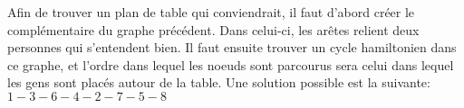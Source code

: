 \begin{figure}[h!]
  \begin{center}
  \end{center}
\end{figure}

\begin{solution}
Afin de trouver un plan de table qui conviendrait, il faut d'abord créer le complémentaire du graphe précédent. Dans celui-ci, les arêtes relient deux personnes qui s'entendent bien. Il faut ensuite trouver un cycle hamiltonien dans ce graphe, et l'ordre dans lequel les noeuds sont parcourus sera celui dans lequel les gens sont placés autour de la table. Une solution possible est la suivante:$1-3-6-4-2-7-5-8$
\end{solution}
